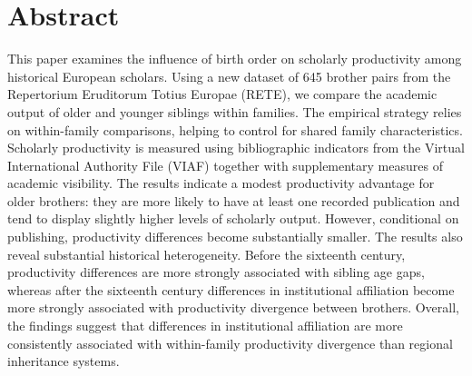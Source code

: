 \setcounter{section}{1}
\section*{Abstract}

This paper examines the influence of birth order on scholarly productivity among historical European scholars. Using a new dataset of 645 brother pairs from the Repertorium Eruditorum Totius Europae (RETE), we compare the academic output of older and younger siblings within families. The empirical strategy relies on within-family comparisons, helping to control for shared family characteristics. Scholarly productivity is measured using bibliographic indicators from the Virtual International Authority File (VIAF) together with supplementary measures of academic visibility. The results indicate a modest productivity advantage for older brothers: they are more likely to have at least one recorded publication and tend to display slightly higher levels of scholarly output. However, conditional on publishing, productivity differences become substantially smaller. The results also reveal substantial historical heterogeneity. Before the sixteenth century, productivity differences are more strongly associated with sibling age gaps, whereas after the sixteenth century differences in institutional affiliation become more strongly associated with productivity divergence between brothers. Overall, the findings suggest that differences in institutional affiliation are more consistently associated with within-family productivity divergence than regional inheritance systems.



